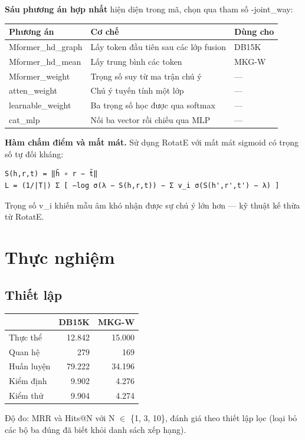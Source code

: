 \documentclass[11pt,a4paper]{article}
\newcommand{\code}[1]{{\ttfamily\small\color{codetext}#1}}
\begin{document}
\textbf{Sáu phương án hợp nhất} hiện diện trong mã, chọn qua tham số \code{-joint\_way}:

\begin{center}\small
\begin{tabular}{@{}lll@{}}
\toprule
\textbf{Phương án} & \textbf{Cơ chế} & \textbf{Dùng cho}\\
\midrule
\code{Mformer\_hd\_graph} & Lấy token đầu tiên sau các lớp fusion & DB15K\\
\code{Mformer\_hd\_mean} & Lấy trung bình các token & MKG-W\\
\code{Mformer\_weight} & Trọng số suy từ ma trận chú ý & ---\\
\code{atten\_weight} & Chú ý tuyến tính một lớp & ---\\
\code{learnable\_weight} & Ba trọng số học được qua softmax & ---\\
\code{cat\_mlp} & Nối ba vector rồi chiếu qua MLP & ---\\
\bottomrule
\end{tabular}
\end{center}
\textbf{Hàm chấm điểm và mất mát.} Sử dụng RotatE với mất mát sigmoid có trọng số tự đối kháng:

\begin{lstlisting}
S(h,r,t) = ‖h̄ ∘ r − t̄‖
L = (1/|T|) Σ [ −log σ(λ − S(h,r,t)) − Σ v_i σ(S(h',r',t') − λ) ]
\end{lstlisting}
Trọng số \code{v\_i} khiến mẫu âm khó nhận được sự chú ý lớn hơn --- kỹ thuật kế thừa từ RotatE.

\section{Thực nghiệm}
\subsection{Thiết lập}
\begin{center}\small
\begin{tabular}{@{}lrr@{}}
\toprule
\textbf{} & \textbf{DB15K} & \textbf{MKG-W}\\
\midrule
Thực thể & 12.842 & 15.000\\
Quan hệ & 279 & 169\\
Huấn luyện & 79.222 & 34.196\\
Kiểm định & 9.902 & 4.276\\
Kiểm thử & 9.904 & 4.274\\
\bottomrule
\end{tabular}
\end{center}
Độ đo: MRR và Hits@N với N $\in$ \{1, 3, 10\}, đánh giá theo thiết lập lọc (loại bỏ các bộ ba đúng đã biết khỏi danh sách xếp hạng).
\end{document}
